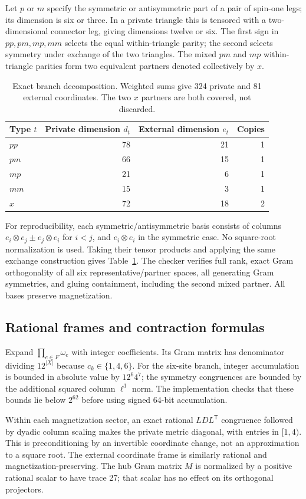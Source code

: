 \documentclass[11pt,a4paper]{article}
\theoremstyle{remark}\newtheorem{remark}[theorem]{Remark}
\begin{document}
Let $p$ or $m$ specify the symmetric or antisymmetric part of a pair of spin-one legs; its dimension is six or three. In a private triangle this is tensored with a two-dimensional connector leg, giving dimensions twelve or six. The first sign in $pp,pm,mp,mm$ selects the equal within-triangle parity; the second selects symmetry under exchange of the two triangles. The mixed $pm$ and $mp$ within-triangle parities form two equivalent partners denoted collectively by $x$.
\begin{table}[ht]\centering
\begin{tabular}{lrrr}\toprule
Type $t$ & Private dimension $d_t$ & External dimension $e_t$ & Copies\\\midrule
$pp$ &78&21&1\\$pm$&66&15&1\\$mp$&21&6&1\\$mm$&15&3&1\\$x$&72&18&2\\\bottomrule
\end{tabular}
\caption{Exact branch decomposition. Weighted sums give 324 private and 81 external coordinates. The two $x$ partners are both covered, not discarded.}\label{tab:D8}
\end{table}

For reproducibility, each symmetric/antisymmetric basis consists of columns $e_i\otimes e_j\pm e_j\otimes e_i$ for $i<j$, and $e_i\otimes e_i$ in the symmetric case. No square-root normalization is used. Taking their tensor products and applying the same exchange construction gives Table~\ref{tab:D8}. The checker verifies full rank, exact Gram orthogonality of all six representative/partner spaces, all generating Gram symmetries, and gluing containment, including the second mixed partner. All bases preserve magnetization.

\subsection{Rational frames and contraction formulas}
Expand $\prod_{e\in F}\omega_e$ with integer coefficients. Its Gram matrix has denominator dividing $12^{|X|}$ because $c_k\in\{1,4,6\}$. For the six-site branch, integer accumulation is bounded in absolute value by $12^6 4^7$; the symmetry congruences are bounded by the additional squared column $\ell^1$ norm. The implementation checks that these bounds lie below $2^{62}$ before using signed 64-bit accumulation.

Within each magnetization sector, an exact rational $LDL^{\mathsf T}$ congruence followed by dyadic column scaling makes the private metric diagonal, with entries in $[1,4)$. This is preconditioning by an invertible coordinate change, not an approximation to a square root. The external coordinate frame is similarly rational and magnetization-preserving. The hub Gram matrix $M$ is normalized by a positive rational scalar to have trace 27; that scalar has no effect on its orthogonal projectors.
\end{document}
